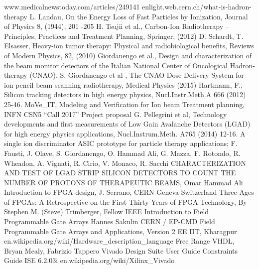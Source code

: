 \begin{thebibliography}{00}	
	www.medicalnewstoday.com/articles/249141
	enlight.web.cern.ch/what-is-hadron-therapy
	L. Landau, On the Energy Loss of Fast Particles by Ionization, Journal of
	Physics 8, (1944), 201 -205
	H. Tsujii et al., Carbon-Ion Radiotherapy – Principles, Practices and Treatment
	Planning, Springer, (2012)
	D. Schardt, T. Elsasser, Heavy-ion tumor therapy: Physical and radiobiological
	benefits, Reviews of Modern Physics, 82, (2010)
	Giordanengo et al., Design and characterization of the beam monitor detectors
	of the Italian National Center of Oncological Hadron-therapy (CNAO).
	S. Giordanengo et al , The CNAO Dose Delivery System for ion pencil beam
	scanning radiotherapy, Medical Physics (2015)
	Hartmann, F., Silicon tracking detectors in high energy physics, Nucl.Instr.Meth.A
	666 (2012) 25-46.
	MoVe\_IT, Modeling and Verification for Ion beam Treatment planning, INFN CSN5 “Call 2017” Project proposal
	G. Pellegrini et al, Technology developments and first measurements of Low Gain Avalanche Detectors (LGAD) for high energy physics applications, Nucl.Instrum.Meth. A765 (2014) 12-16.
	A single ion discriminator ASIC prototype for particle therapy applications; F. Fausti, J. Olave, S. Giordanengo, O. Hammad Ali, G. Mazza, F. Rotondo, R. Wheadon, A. Vignati, R. Cirio, V. Monaco, R. Sacchi
	CHARACTERIZATION AND TEST OF LGAD STRIP SILICON DETECTORS TO COUNT THE NUMBER OF PROTONS OF THERAPEUTIC BEAMS, Omar Hammad Ali
	Introduction to FPGA design, J. Serrano, CERN-Geneva-Switzerland
	Three Ages of FPGAs: A Retrospective on the First Thirty Years of FPGA Technology, By Stephen M. (Steve) Trimberger, Fellow IEEE
	Introduction to Field Programmable Gate Arrays Hannes Sakulin CERN / EP-CMD
	Field Programmable Gate Arrays and Applications, Version 2 EE IIT, Kharagpur
	en.wikipedia.org/wiki/Hardware\_description\_language
	Free Range VHDL, Bryan Mealy, Fabrizio Tappero
	Vivado Design Suite User Guide
	\thispagestyle{plain}
	Constraints Guide ISE 6.2.03i
	en.wikipedia.org/wiki/Xilinx\_Vivado

\end{thebibliography}
